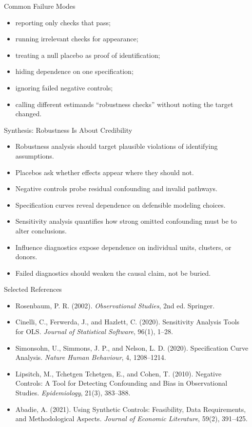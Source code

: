 \documentclass[aspectratio=169,11pt]{beamer}
\begin{document}
\begin{frame}{Common Failure Modes}
\begin{itemize}
\item reporting only checks that pass;
\item running irrelevant checks for appearance;
\item treating a null placebo as proof of identification;
\item hiding dependence on one specification;
\item ignoring failed negative controls;
\item calling different estimands “robustness checks” without noting the target changed.
\end{itemize}
\end{frame}

\begin{frame}{Synthesis: Robustness Is About Credibility}
\begin{itemize}
\item Robustness analysis should target plausible violations of identifying assumptions.
\item Placebos ask whether effects appear where they should not.
\item Negative controls probe residual confounding and invalid pathways.
\item Specification curves reveal dependence on defensible modeling choices.
\item Sensitivity analysis quantifies how strong omitted confounding must be to alter conclusions.
\item Influence diagnostics expose dependence on individual units, clusters, or donors.
\item Failed diagnostics should weaken the causal claim, not be buried.
\end{itemize}
\end{frame}

\begin{frame}{Selected References}
\small
\begin{itemize}
\item Rosenbaum, P. R. (2002). \textit{Observational Studies}, 2nd ed. Springer.
\item Cinelli, C., Ferwerda, J., and Hazlett, C. (2020). Sensitivity Analysis Tools for OLS. \textit{Journal of Statistical Software}, 96(1), 1--28.
\item Simonsohn, U., Simmons, J. P., and Nelson, L. D. (2020). Specification Curve Analysis. \textit{Nature Human Behaviour}, 4, 1208--1214.
\item Lipsitch, M., Tchetgen Tchetgen, E., and Cohen, T. (2010). Negative Controls: A Tool for Detecting Confounding and Bias in Observational Studies. \textit{Epidemiology}, 21(3), 383--388.
\item Abadie, A. (2021). Using Synthetic Controls: Feasibility, Data Requirements, and Methodological Aspects. \textit{Journal of Economic Literature}, 59(2), 391--425.
\end{itemize}
\end{frame}

\contactslide
\end{document}
